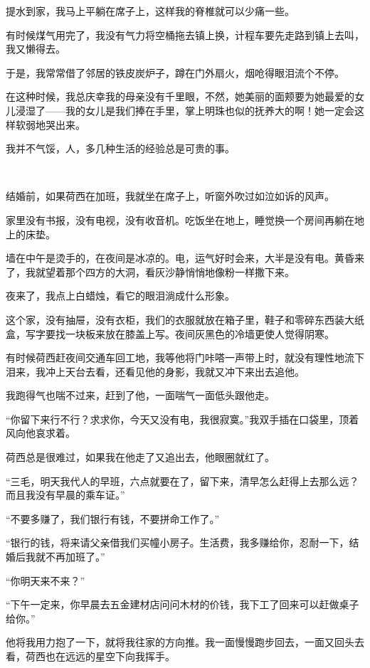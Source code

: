 \par 提水到家，我马上平躺在席子上，这样我的脊椎就可以少痛一些。
\par 有时候煤气用完了，我没有气力将空桶拖去镇上换，计程车要先走路到镇上去叫，我又懒得去。
\par 于是，我常常借了邻居的铁皮炭炉子，蹲在门外扇火，烟呛得眼泪流个不停。
\par 在这种时候，我总庆幸我的母亲没有千里眼，不然，她美丽的面颊要为她最爱的女儿浸湿了——我的女儿是我们捧在手里，掌上明珠也似的抚养大的啊！她一定会这样软弱地哭出来。
\par 我并不气馁，人，多几种生活的经验总是可贵的事。
\par  
\par 结婚前，如果荷西在加班，我就坐在席子上，听窗外吹过如泣如诉的风声。
\par 家里没有书报，没有电视，没有收音机。吃饭坐在地上，睡觉换一个房间再躺在地上的床垫。
\par 墙在中午是烫手的，在夜间是冰凉的。电，运气好时会来，大半是没有电。黄昏来了，我就望着那个四方的大洞，看灰沙静悄悄地像粉一样撒下来。
\par 夜来了，我点上白蜡烛，看它的眼泪淌成什么形象。
\par 这个家，没有抽屉，没有衣柜，我们的衣服就放在箱子里，鞋子和零碎东西装大纸盒，写字要找一块板来放在膝盖上写。夜间灰黑色的冷墙更使人觉得阴寒。
\par 有时候荷西赶夜间交通车回工地，我等他将门咔嗒一声带上时，就没有理性地流下泪来，我冲上天台去看，还看见他的身影，我就又冲下来出去追他。
\par 我跑得气也喘不过来，赶到了他，一面喘气一面低头跟他走。
\par “你留下来行不行？求求你，今天又没有电，我很寂寞。”我双手插在口袋里，顶着风向他哀求着。
\par 荷西总是很难过，如果我在他走了又追出去，他眼圈就红了。
\par “三毛，明天我代人的早班，六点就要在了，留下来，清早怎么赶得上去那么远？而且我没有早晨的乘车证。”
\par “不要多赚了，我们银行有钱，不要拼命工作了。”
\par “银行的钱，将来请父亲借我们买幢小房子。生活费，我多赚给你，忍耐一下，结婚后我就不再加班了。”
\par “你明天来不来？”
\par “下午一定来，你早晨去五金建材店问问木材的价钱，我下工了回来可以赶做桌子给你。”
\par 他将我用力抱了一下，就将我往家的方向推。我一面慢慢跑步回去，一面又回头去看，荷西也在远远的星空下向我挥手。
